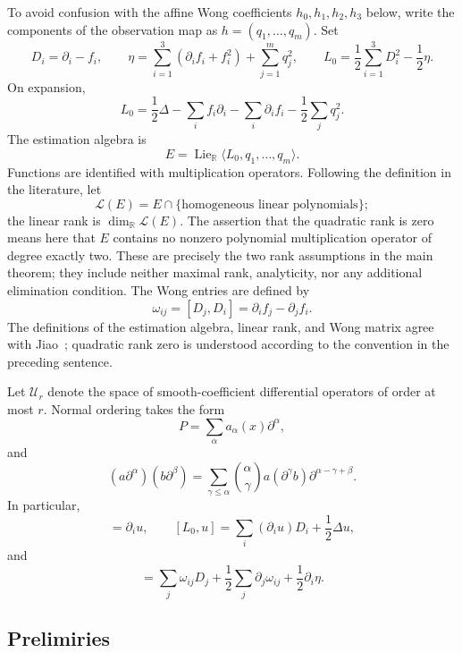 \documentclass[11pt,a4paper]{article}
\numberwithin{equation}{section}
\theoremstyle{journalplain}
\theoremstyle{journaldef}
\newcommand{\R}{\mathbb R}
\newcommand{\U}{\mathcal U}
\newcommand{\pd}{\partial}
\begin{document}
To avoid confusion with the affine Wong coefficients
$h_0,h_1,h_2,h_3$ below, write the components of the observation map as
$h=(q_1,\ldots,q_m)$.  Set
\begin{equation}
D_i=\pd_i-f_i,\qquad
\eta=\sum_{i=1}^{3}(\pd_i f_i+f_i^2)+\sum_{j=1}^{m}q_j^2,
\qquad
L_0=\frac12\sum_{i=1}^{3}D_i^2-\frac12\eta .
\label{eq:D-eta-L0}
\end{equation}
On expansion,
\[
L_0=\frac12\Delta-\sum_i f_i\pd_i-\sum_i\pd_i f_i
       -\frac12\sum_jq_j^2.
\]
The estimation algebra is
\[
E=\operatorname{Lie}_{\R}\langle L_0,q_1,\ldots,q_m\rangle .
\]
Functions are identified with multiplication operators.  Following the
definition in the literature, let
\[
\mathscr L(E)=E\cap\{\text{homogeneous linear polynomials}\};
\]
the linear rank is $\dim_\R\mathscr L(E)$.  The assertion that the quadratic
rank is zero means here that $E$ contains no nonzero polynomial multiplication
operator of degree exactly two.  These are precisely the two rank assumptions
in the main theorem; they include neither maximal rank, analyticity, nor any
additional elimination condition.  The Wong entries are defined by
\begin{equation}
\omega_{ij}=[D_j,D_i]=\pd_i f_j-\pd_j f_i.
\label{eq:wong-def}
\end{equation}
The definitions of the estimation algebra, linear rank, and Wong matrix agree
with Jiao~\cite[Definitions 2.3--2.5, pp.~21--22]{Jiao2022}; quadratic rank
zero is understood according to the convention in the preceding sentence.

Let $\U_r$ denote the space of smooth-coefficient differential operators of
order at most $r$.  Normal ordering takes the form
\[
P=\sum_\alpha a_\alpha(x)\pd^\alpha,
\]
and
\begin{equation}
(a\pd^\alpha)(b\pd^\beta)
=\sum_{\gamma\le\alpha}\binom{\alpha}{\gamma}
a(\pd^\gamma b)\pd^{\alpha-\gamma+\beta}.
\label{eq:normal-product}
\end{equation}
In particular,
\begin{equation}
[D_i,u]=\pd_i u,\qquad
[L_0,u]=\sum_i(\pd_i u)D_i+\frac12\Delta u,
\label{eq:function-brackets}
\end{equation}
and
\begin{equation}
[L_0,D_i]
=\sum_j\omega_{ij}D_j
 +\frac12\sum_j\pd_j\omega_{ij}
 +\frac12\pd_i\eta .
\label{eq:L0Di}
\end{equation}


\subsection{Prelimiries}
\end{document}
